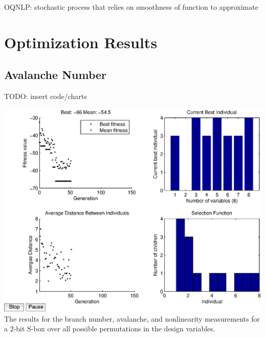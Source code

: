 \documentclass[11pt]{article}
\begin{document}
OQNLP: stochastic process that relies on smoothness of function to approximate

\section{Optimization Results}

\subsection{Avalanche Number}
TODO: insert code/charts

\begin{center}
	\includegraphics[scale=0.75]{images/avalanche_results8.eps} \\
	\label{bfjoint}
The results for the branch number, avalanche, and nonlinearity measurements for a $2$-bit S-box over all possible permutations in the design variables. 
\end{center}
\end{document}
